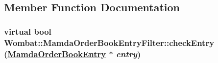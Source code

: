 \subsection{Member Function Documentation}
\hypertarget{classWombat_1_1MamdaOrderBookEntryFilter_20aee34e2dbaf411a6fa06d98fd41411}{
\subsubsection[checkEntry]{\setlength{\rightskip}{0pt plus 5cm}virtual bool Wombat::Mamda\-Order\-Book\-Entry\-Filter::check\-Entry (\hyperlink{classWombat_1_1MamdaOrderBookEntry}{Mamda\-Order\-Book\-Entry} $\ast$ {\em entry})}}
\label{classWombat_1_1MamdaOrderBookEntryFilter_20aee34e2dbaf411a6fa06d98fd41411}


